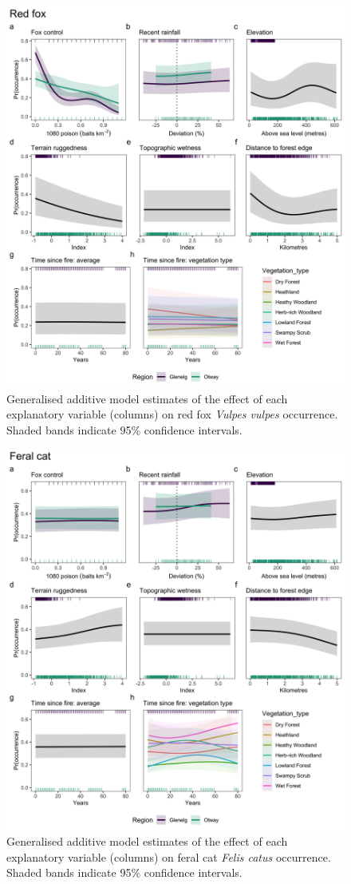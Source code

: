 \documentclass[]{elsarticle} %
\begin{document}
\begin{figure}

{\centering \includegraphics[width=0.8\linewidth]{../figs/gams_fox} 

}

\caption{Generalised additive model estimates of the effect of each explanatory variable (columns) on red fox \textit{Vulpes vulpes} occurrence. Shaded bands indicate 95\% confidence intervals.}\label{fig:gams-occ-fox}
\end{figure}

\newpage

\begin{figure}

{\centering \includegraphics[width=0.8\linewidth]{../figs/gams_cat} 

}

\caption{Generalised additive model estimates of the effect of each explanatory variable (columns) on feral cat \textit{Felis catus} occurrence. Shaded bands indicate 95\% confidence intervals.}\label{fig:gams-occ-cat}
\end{figure}
\end{document}
